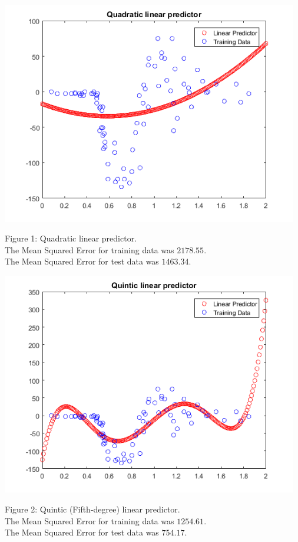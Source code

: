 \documentclass[]{report}   %
\begin{document}
\begin{center}
	\includegraphics[width=35em]{2_1_Figure_1.png}
\end{center} 
{Figure 1: Quadratic linear predictor.} \\
{The Mean Squared Error for training data was $2178.55$.} \\
{The Mean Squared Error for test data was $1463.34$.} \\

\begin{center}
	\includegraphics[width=35em]{2_1_Figure_2.png}
\end{center} 
{Figure 2: Quintic (Fifth-degree) linear predictor.} \\
{The Mean Squared Error for training data was $1254.61$.} \\
{The Mean Squared Error for test data was $754.17$.} \\
\end{document}
